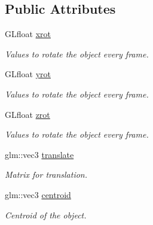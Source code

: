 \subsection*{Public Attributes}
{\bf }\par
\begin{DoxyCompactItemize}
\item 
G\+Lfloat \hyperlink{classcft_1_1Model_acbb04bd0c86255df2b5beb20b746d454}{xrot}\hypertarget{classcft_1_1Model_acbb04bd0c86255df2b5beb20b746d454}{}\label{classcft_1_1Model_acbb04bd0c86255df2b5beb20b746d454}

\begin{DoxyCompactList}\small\item\em Values to rotate the object every frame. \end{DoxyCompactList}\item 
G\+Lfloat \hyperlink{classcft_1_1Model_a03ad51f746ea311de670b3963b30ca11}{yrot}\hypertarget{classcft_1_1Model_a03ad51f746ea311de670b3963b30ca11}{}\label{classcft_1_1Model_a03ad51f746ea311de670b3963b30ca11}

\begin{DoxyCompactList}\small\item\em Values to rotate the object every frame. \end{DoxyCompactList}\item 
G\+Lfloat \hyperlink{classcft_1_1Model_a77a1d55e1de845a548a00f3a037cc846}{zrot}\hypertarget{classcft_1_1Model_a77a1d55e1de845a548a00f3a037cc846}{}\label{classcft_1_1Model_a77a1d55e1de845a548a00f3a037cc846}

\begin{DoxyCompactList}\small\item\em Values to rotate the object every frame. \end{DoxyCompactList}\item 
glm\+::vec3 \hyperlink{classcft_1_1Model_a8a73f59bc372ee82bd680a4fedb4c245}{translate}\hypertarget{classcft_1_1Model_a8a73f59bc372ee82bd680a4fedb4c245}{}\label{classcft_1_1Model_a8a73f59bc372ee82bd680a4fedb4c245}

\begin{DoxyCompactList}\small\item\em Matrix for translation. \end{DoxyCompactList}\item 
glm\+::vec3 \hyperlink{classcft_1_1Model_a7c3ffd13ca3897bc54b5a5f68e48635c}{centroid}\hypertarget{classcft_1_1Model_a7c3ffd13ca3897bc54b5a5f68e48635c}{}\label{classcft_1_1Model_a7c3ffd13ca3897bc54b5a5f68e48635c}

\begin{DoxyCompactList}\small\item\em Centroid of the object. \end{DoxyCompactList}\end{DoxyCompactItemize}

